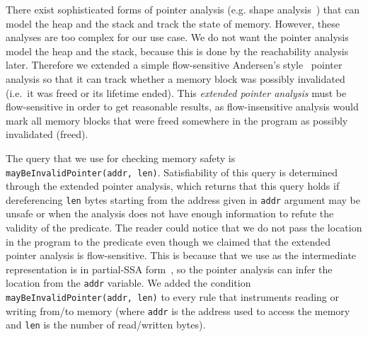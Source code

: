 There exist sophisticated forms of pointer analysis (e.g. shape
analysis~\cite{Rinetzky2001,Hind01}) that can model the heap and the
stack and track the state of memory.  However, these analyses are too
complex for our use case. We do not want the pointer analysis model
the heap and the stack, because this is done by the reachability
analysis later.  Therefore we extended a simple flow-sensitive
Andersen's style~\cite{and94} pointer analysis so that it can track
whether a memory block was possibly invalidated (i.e.~it was freed or
its lifetime ended).  This \emph{extended pointer analysis} must be
flow-sensitive in order to get reasonable results, as flow-insensitive
analysis would mark all memory blocks that were freed somewhere in the
program as possibly invalidated (freed).

The query that we use for checking memory safety is
\texttt{mayBeInvalidPointer(addr, len)}.  Satisfiability of this
query is determined through the extended pointer
analysis, which returns that this query holds if dereferencing
\texttt{len} bytes starting from the address given in \texttt{addr}
argument may be unsafe or when the analysis does not have enough
information to refute the validity of the predicate.  The reader could
notice that we do not pass the location in the program to the
predicate even though we claimed that the extended pointer analysis is
flow-sensitive. This is because \llvm that we use as the intermediate
representation is in partial-SSA form~\cite{Lattner04}, so the pointer
analysis can infer the location from the \texttt{addr} variable.
We added the condition \texttt{mayBeInvalidPointer(addr, len)} to
every rule that instruments reading or writing from/to memory (where
\texttt{addr} is the address used to access the memory and
\texttt{len} is the number of read/written bytes). 

